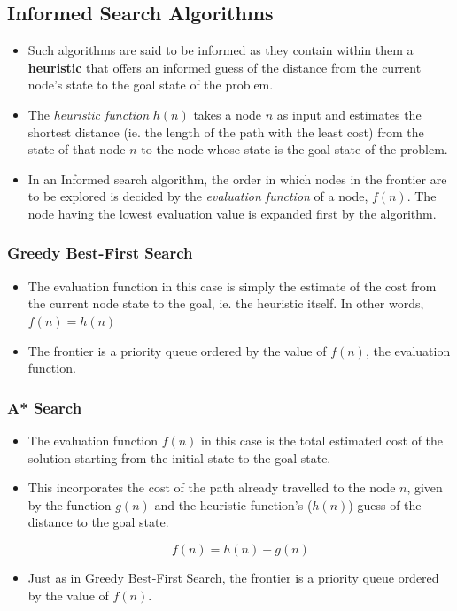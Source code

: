 \documentclass{article}
\theoremstyle{plain}
\theoremstyle{definition}
\begin{document}
\subsection{Informed Search Algorithms}
\begin{itemize}
    \item Such algorithms are said to be informed as they contain within them a \textbf{heuristic} that offers an informed guess of the distance from the current node's state to the goal state of the problem. 
    
    \item The \textit{heuristic function} $h(n)$ takes a node $n$ as input and estimates the shortest distance (ie. the length of the path with the least cost) from the state of that node $n$ to the node whose state is the goal state of the problem.  
    
    \item In an Informed search algorithm, the order in which nodes in the frontier are to be explored is decided by the \textit{evaluation function} of a node, $f(n)$. The node having the lowest evaluation value is expanded first by the algorithm. 
\end{itemize}

\subsubsection{Greedy Best-First Search}
\begin{itemize}
    \item The evaluation function in this case is simply the estimate of the cost from the current node state to the goal, ie. the heuristic itself. In other words, $f(n) = h(n)$
    
    \item The frontier is a priority queue ordered by the value of $f(n)$, the evaluation function. 
\end{itemize}

\subsubsection{A* Search}
\begin{itemize}
    \item The evaluation function $f(n)$ in this case is the total estimated cost of the solution starting from the initial state to the goal state. 
    
    \item This incorporates the cost of the path already travelled to the node $n$, given by the function $g(n)$ and the heuristic function's ($h(n)$) guess of the distance to the goal state. 
    
    \begin{equation}
        f(n) = h(n) + g(n)
    \end{equation}
    
    \item Just as in Greedy Best-First Search, the frontier is a priority queue ordered by the value of $f(n)$. 
\end{itemize}
\end{document}
